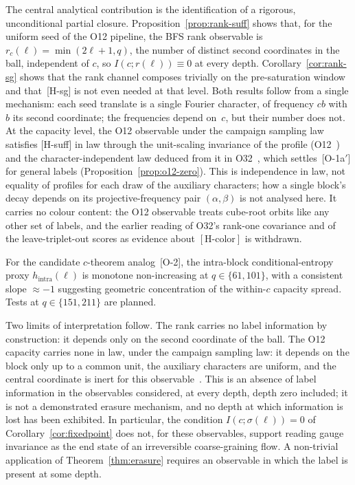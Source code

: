 \documentclass[11pt,a4paper]{article}
\theoremstyle{plain}
\theoremstyle{definition}
\theoremstyle{remark}
\begin{document}
  The central analytical contribution is the identification of a rigorous, unconditional
  partial closure.
  Proposition~\ref{prop:rank-suff} shows that, for the uniform seed of the O12 pipeline,
  the BFS rank observable is $r_c(\ell) = \min(2\ell+1, q)$, the number of distinct second
  coordinates in the ball, independent of $c$, so $I(c;r(\ell)) \equiv 0$ at every depth.
  Corollary~\ref{cor:rank-sg} shows that the rank channel composes trivially on the
  pre-saturation window and that~\textup{[H-sg]} is not even needed at that level.
  Both results follow from a single mechanism: each seed translate is a single Fourier
  character, of frequency $cb$ with $b$ its second coordinate; the frequencies depend on~$c$, but
  their number does not.
  At the capacity level, the O12 observable under the campaign sampling law satisfies
  \textup{[H-suff]} in law through the unit-scaling invariance of the profile
  (O12~\cite{Beau2026a16}) and the character-independent law deduced from it in
  O32~\cite{Beau2026a36}, which settles~\textup{[O-1a$'$]} for general labels
  (Proposition~\ref{prop:o12-zero}).
  This is independence in law, not equality of profiles for each draw of the auxiliary
  characters; how a single block's decay depends on its projective-frequency pair
  $(\alpha,\beta)$ is not analysed here.
  It carries no colour content: the O12 observable treats cube-root orbits like any other set
  of labels, and the earlier reading of O32's rank-one covariance and of the leave-triplet-out
  scores as evidence about $[\mathrm{H\text{-}color}]$ is withdrawn.

  For the candidate $c$-theorem analog~\textup{[O-2]}, the intra-block conditional-entropy
  proxy $h_{\mathrm{intra}}(\ell)$ is monotone non-increasing at $q \in \{61, 101\}$,
  with a consistent slope ${\approx}{-1}$ suggesting geometric concentration of the
  within-$c$ capacity spread.
  Tests at $q \in \{151, 211\}$ are planned.

  Two limits of interpretation follow.
  The rank carries no label information by construction: it depends only on the second
  coordinate of the ball. The O12 capacity carries none in law, under the campaign sampling law:
  it depends on the block only up to a common unit, the auxiliary characters are uniform, and the
  central coordinate is inert for this observable~\cite{Beau2026a16}.
  This is an absence of label information in the observables considered, at every depth,
  depth zero included; it is not a demonstrated erasure mechanism, and no depth at which
  information is lost has been exhibited.
  In particular, the condition $I(c;\sigma(\ell)) = 0$ of Corollary~\ref{cor:fixedpoint} does
  not, for these observables, support reading gauge invariance as the end state of an irreversible
  coarse-graining flow.
  A non-trivial application of Theorem~\ref{thm:erasure} requires an observable in which the
  label is present at some depth.
\end{document}
